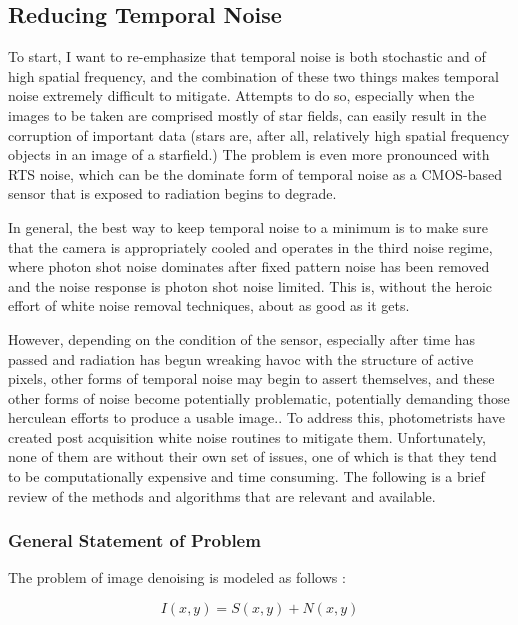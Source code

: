 \documentclass[10pt]{article}
\begin{document}
\subsection{Reducing Temporal Noise}
\label{sec:temporalnoisereduction}

To start, I want to re-emphasize that temporal noise is both stochastic and of high spatial frequency, and the combination of these two things makes temporal noise extremely difficult to mitigate. Attempts to do so, especially when the images to be taken are comprised mostly of star fields, can easily result in the corruption of important data (stars are, after all, relatively high spatial frequency objects in an image of a starfield.) The problem is even more pronounced with RTS noise, which can be the dominate form of temporal noise as a CMOS-based sensor that is exposed to radiation begins to degrade. 

In general, the best way to keep temporal noise to a minimum is to make sure that the camera is appropriately cooled and operates in the third noise regime, where photon shot noise dominates after fixed pattern noise has been removed and the noise response is photon shot noise limited. This is, without the heroic effort of white noise removal techniques, about as good as it gets.

However, depending on the condition of the sensor, especially after time has passed and radiation has begun wreaking havoc with the structure of active pixels, other forms of temporal noise may begin to assert themselves, and these other forms of noise become potentially problematic, potentially demanding those herculean efforts to produce a usable image.. To address this, photometrists have created post acquisition white noise routines to mitigate them. Unfortunately, none of them are without their own set of issues, one of which is that they tend to be computationally expensive and time consuming. The following is a brief review of the methods and algorithms that are relevant and available.

\subsubsection{General Statement of Problem}

The problem of image denoising is modeled as follows \cite{fan19}:

$$ I(x,y) = S(x,y) + N(x,y) $$

\vspace{2mm}
\end{document}
